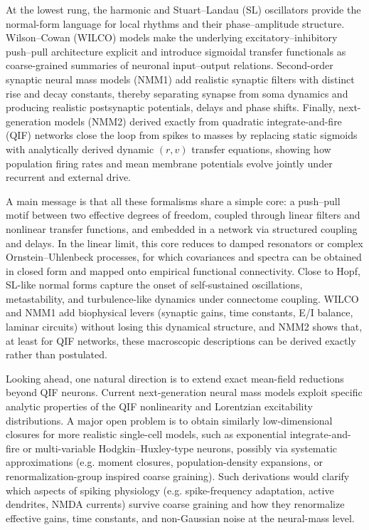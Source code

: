 \documentclass[11pt]{article}
\numberwithin{equation}{section}
\begin{document}
At the lowest rung, the harmonic and Stuart–Landau (SL) oscillators provide the normal-form language for local rhythms and their phase–amplitude structure. Wilson–Cowan (WILCO) models make the underlying excitatory–inhibitory push–pull architecture explicit and introduce sigmoidal transfer functionals as coarse-grained summaries of neuronal input–output relations. Second-order synaptic neural mass models (NMM1) add realistic synaptic filters with distinct rise and decay constants, thereby separating synapse from soma dynamics and producing realistic postsynaptic potentials, delays and phase shifts. Finally, next-generation models (NMM2) derived exactly from quadratic integrate-and-fire (QIF) networks close the loop from spikes to masses by replacing static sigmoids with analytically derived dynamic $(r,v)$ transfer equations, showing how population firing rates and mean membrane potentials evolve jointly under recurrent and external drive.\cite{montbrioMacroscopicDescriptionNetworks2015,coombesNextGenerationNeural2019,byrneNextgenerationNeuralMass2020,clusellaComparisonExactHeuristic2023}

A main message is that all these formalisms share a simple core: a push–pull motif between two effective degrees of freedom, coupled through linear filters and nonlinear transfer functions, and embedded in a network via structured coupling and delays. In the linear limit, this core reduces to damped resonators or complex Ornstein–Uhlenbeck processes, for which covariances and spectra can be obtained in closed form and mapped onto empirical functional connectivity.\cite{ponce-alvarezHopfWholebrainModel2024,Nozari2024} Close to Hopf, SL-like normal forms capture the onset of self-sustained oscillations, metastability, and turbulence-like dynamics under connectome coupling.\cite{decoTurbulentlikeDynamicsHuman2020,cabralMetastableOscillatoryModes2022,Escrichs2022Turbulence} WILCO and NMM1 add biophysical levers (synaptic gains, time constants, E/I balance, laminar circuits) without losing this dynamical structure, and NMM2 shows that, at least for QIF networks, these macroscopic descriptions can be derived exactly rather than postulated.

Looking ahead, one natural direction is to extend exact mean-field reductions beyond QIF neurons. Current next-generation neural mass models exploit specific analytic properties of the QIF nonlinearity and Lorentzian excitability distributions.\cite{montbrioMacroscopicDescriptionNetworks2015,coombesNextGenerationNeural2019} A major open problem is to obtain similarly low-dimensional closures for more realistic single-cell models, such as exponential integrate-and-fire or multi-variable Hodgkin–Huxley-type neurons, possibly via systematic approximations (e.g. moment closures, population-density expansions, or renormalization-group inspired coarse graining).\cite{nykampPopulationDensityApproach2000,buiceSystematicFluctuationExpansion2010,Goldobin2021} Such derivations would clarify which aspects of spiking physiology (e.g. spike-frequency adaptation, active dendrites, NMDA currents) survive coarse graining and how they renormalize effective gains, time constants, and non-Gaussian noise at the neural-mass level.
\end{document}
